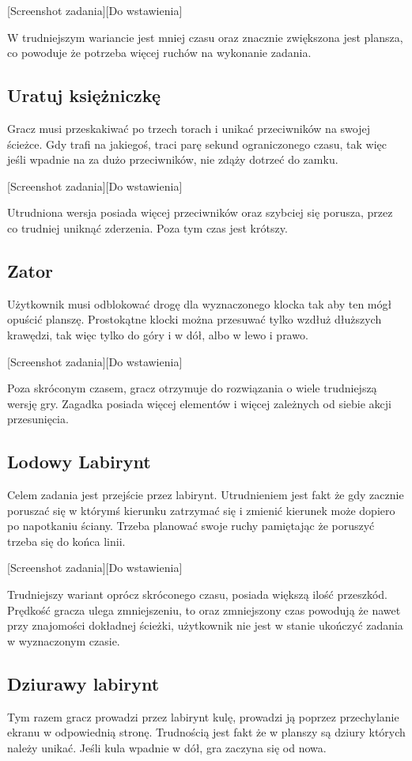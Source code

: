 \documentclass[openright]{xmgr}
\begin{document}
[Screenshot zadania][Do wstawienia]

W trudniejszym wariancie jest mniej czasu oraz znacznie zwiększona jest plansza, co powoduje że potrzeba więcej ruchów na wykonanie zadania.

\subsection{Uratuj księżniczkę}
Gracz musi przeskakiwać po trzech torach i unikać przeciwników na swojej ścieżce. Gdy trafi na jakiegoś, traci parę sekund ograniczonego czasu, tak więc jeśli wpadnie na za dużo przeciwników, nie zdąży dotrzeć do zamku.

[Screenshot zadania][Do wstawienia]

Utrudniona wersja posiada więcej przeciwników oraz szybciej się porusza, przez co trudniej uniknąć zderzenia. Poza tym czas jest krótszy.

\subsection{Zator}
Użytkownik musi odblokować drogę dla wyznaczonego klocka tak aby ten mógł opuścić planszę. Prostokątne klocki można przesuwać tylko wzdłuż dłuższych krawędzi, tak więc tylko do góry i w dół, albo w lewo i prawo. 

[Screenshot zadania][Do wstawienia]

Poza skróconym czasem, gracz otrzymuje do rozwiązania o wiele trudniejszą wersję gry. Zagadka posiada więcej elementów i więcej zależnych od siebie akcji przesunięcia.

\subsection{Lodowy Labirynt}
Celem zadania jest przejście przez labirynt. Utrudnieniem jest fakt że gdy zacznie poruszać się w którymś kierunku zatrzymać się i zmienić kierunek może dopiero po napotkaniu ściany. Trzeba planować swoje ruchy pamiętając że poruszyć trzeba się do końca linii.

[Screenshot zadania][Do wstawienia]

Trudniejszy wariant oprócz skróconego czasu, posiada większą ilość przeszkód. Prędkość gracza ulega zmniejszeniu, to oraz zmniejszony czas powodują że nawet przy znajomości dokładnej ścieżki, użytkownik nie jest w stanie ukończyć zadania w wyznaczonym czasie.

\subsection{Dziurawy labirynt}
Tym razem gracz prowadzi przez labirynt kulę, prowadzi ją poprzez przechylanie ekranu w odpowiednią stronę. Trudnością jest fakt że w planszy są dziury których należy unikać. Jeśli kula wpadnie w dół, gra zaczyna się od nowa.
\end{document}

